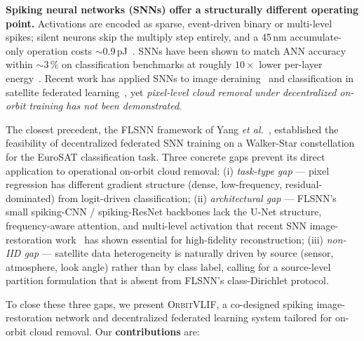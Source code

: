 \documentclass[conference]{IEEEtran}
\newcommand{\OrbitVLIF}{\textsc{OrbitVLIF}}
\begin{document}
\textbf{Spiking neural networks (SNNs) offer a structurally
different operating point.} Activations are encoded as sparse,
event-driven binary or multi-level spikes; silent neurons skip the
multiply step entirely, and a 45\,nm accumulate-only operation
costs $\sim$0.9\,pJ~\cite{ref:horowitz}. SNNs have been shown to
match ANN accuracy within $\sim$3\,\% on classification benchmarks at
roughly $10\!\times$ lower per-layer energy~\cite{ref:flsnn}. Recent
work has applied SNNs to image deraining~\cite{ref:esdnet} and
classification in satellite federated learning~\cite{ref:flsnn},
yet \emph{pixel-level cloud removal under decentralized on-orbit
training has not been demonstrated}.

The closest precedent, the FLSNN framework of Yang \emph{et al.}~\cite{ref:flsnn},
established the feasibility of decentralized federated SNN training
on a Walker-Star constellation for the EuroSAT classification task.
Three concrete gaps prevent its direct application to operational
on-orbit cloud removal: (i) \emph{task-type gap} --- pixel
regression has different gradient structure (dense, low-frequency,
residual-dominated) from logit-driven classification; (ii)
\emph{architectural gap} --- FLSNN's small spiking-CNN /
spiking-ResNet backbones lack the U-Net structure, frequency-aware
attention, and multi-level activation that recent SNN
image-restoration work~\cite{ref:fsta-snn,ref:darkir} has shown
essential for high-fidelity reconstruction; (iii)
\emph{non-IID gap} --- satellite data heterogeneity is naturally
driven by source (sensor, atmosphere, look angle) rather than by
class label, calling for a source-level partition formulation that
is absent from FLSNN's class-Dirichlet protocol.

To close these three gaps, we present \OrbitVLIF, a co-designed
spiking image-restoration network and decentralized federated
learning system tailored for on-orbit cloud removal. Our
\textbf{contributions} are:
\end{document}
